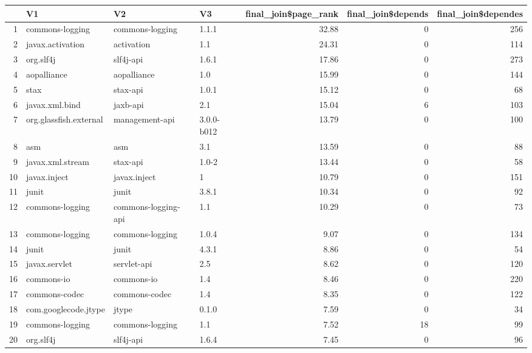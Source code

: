 \begin{table}[ht]
\centering
\begin{tabular}{rlllrrr}
  \hline
 & V1 & V2 & V3 & final\_join\$page\_rank & final\_join\$depends & final\_join\$dependes \\ 
  \hline
1 & commons-logging & commons-logging & 1.1.1 & 32.88 &   0 & 256 \\ 
  2 & javax.activation & activation & 1.1 & 24.31 &   0 & 114 \\ 
  3 & org.slf4j & slf4j-api & 1.6.1 & 17.86 &   0 & 273 \\ 
  4 & aopalliance & aopalliance & 1.0 & 15.99 &   0 & 144 \\ 
  5 & stax & stax-api & 1.0.1 & 15.12 &   0 &  68 \\ 
  6 & javax.xml.bind & jaxb-api & 2.1 & 15.04 &   6 & 103 \\ 
  7 & org.glassfish.external & management-api & 3.0.0-b012 & 13.79 &   0 & 100 \\ 
  8 & asm & asm & 3.1 & 13.59 &   0 &  88 \\ 
  9 & javax.xml.stream & stax-api & 1.0-2 & 13.44 &   0 &  58 \\ 
  10 & javax.inject & javax.inject & 1 & 10.79 &   0 & 151 \\ 
  11 & junit & junit & 3.8.1 & 10.34 &   0 &  92 \\ 
  12 & commons-logging & commons-logging-api & 1.1 & 10.29 &   0 &  73 \\ 
  13 & commons-logging & commons-logging & 1.0.4 & 9.07 &   0 & 134 \\ 
  14 & junit & junit & 4.3.1 & 8.86 &   0 &  54 \\ 
  15 & javax.servlet & servlet-api & 2.5 & 8.62 &   0 & 120 \\ 
  16 & commons-io & commons-io & 1.4 & 8.46 &   0 & 220 \\ 
  17 & commons-codec & commons-codec & 1.4 & 8.35 &   0 & 122 \\ 
  18 & com.googlecode.jtype & jtype & 0.1.0 & 7.59 &   0 &  34 \\ 
  19 & commons-logging & commons-logging & 1.1 & 7.52 &  18 &  99 \\ 
  20 & org.slf4j & slf4j-api & 1.6.4 & 7.45 &   0 &  96 \\ 
   \hline
\end{tabular}
\end{table}
